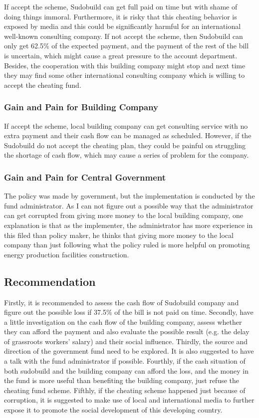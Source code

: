 \documentclass[11pt, a4paper]{article}
\begin{document}
If accept the scheme, Sudobuild can get full paid on time but with shame of doing things immoral. Furthermore, it is risky that this cheating behavior is exposed by media and this could be significantly harmful for an international well-known consulting company. If not accept the scheme, then Sudobuild can only get 62.5\% of the expected payment, and the payment of the rest of the bill is uncertain, which might cause a great pressure to the account department. Besides, the cooperation with this building company might stop and next time they may find some other international consulting company which is willing to accept the cheating fund.

\subsubsection{Gain and Pain for Building Company}

If accept the scheme, local building company can get consulting service with no extra payment and their cash flow can be managed as scheduled. However, if the Sudobuild do not accept the cheating plan, they could be painful on struggling the shortage of cash flow, which may cause a series of problem for the company.

\subsubsection{Gain and Pain for Central Government}

The policy was made by government, but the implementation is conducted by the fund administrator. As I can not figure out a possible way that the administrator can get corrupted from giving more money to the local building company, one explanation is that as the implementer, the administrator has more experience in this filed than policy maker, he thinks that giving more money to the local company than just following what the policy ruled is more helpful on promoting energy production facilities construction.


\subsection{Recommendation}

Firstly, it is recommended to assess the cash flow of Sudobuild company and figure out the possible loss if 37.5\% of the bill is not paid on time. Secondly, have a little investigation on the cash flow of the building company, assess whether they can afford the payment and also evaluate the possible result (e.g. the delay of grassroots workers' salary) and their social influence. Thirdly, the source and direction of the government fund need to be explored. It is also suggested to have a talk with the fund administrator if possible. Fourthly, if the cash situation of both sudobuild and the building company can afford the loss, and the money in the fund is more useful than benefiting the building company, just refuse the cheating fund scheme. Fifthly, if the cheating scheme happened just because of corruption, it is suggested to make use of local and international media to further expose it to promote the social development of this developing country.
\end{document}
